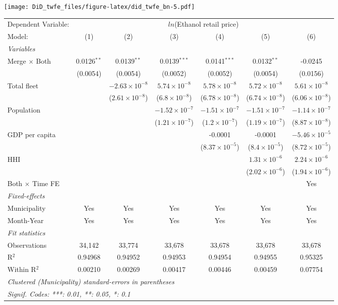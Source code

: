 \documentclass[
]{article}
\begin{document}
\texttt{[image: DiD\_twfe\_files/figure-latex/did\_twfe\_bn-5.pdf]}

\begin{tabular}{lcccccc}
\tabularnewline\midrule\midrule
Dependent Variable:&\multicolumn{6}{c}{$ln$(Ethanol retail price)}\\
Model:&(1) & (2) & (3) & (4) & (5) & (6)\\
\midrule \emph{Variables}&   &   &   &   &   &  \\
Merge $\times $ Both & 0.0126$^{**}$ & 0.0139$^{**}$ & 0.0139$^{***}$ & 0.0141$^{***}$ & 0.0132$^{**}$ & -0.0245\\
  &(0.0054) & (0.0054) & (0.0052) & (0.0052) & (0.0054) & (0.0156)\\
Total fleet &    & $-2.63\times 10^{-8}$ & $5.74\times 10^{-8}$ & $5.78\times 10^{-8}$ & $5.72\times 10^{-8}$ & $5.61\times 10^{-8}$\\
  &   & ($2.61\times 10^{-8}$) & ($6.8\times 10^{-8}$) & ($6.78\times 10^{-8}$) & ($6.74\times 10^{-8}$) & ($6.06\times 10^{-8}$)\\
Population &    &    & $-1.52\times 10^{-7}$ & $-1.51\times 10^{-7}$ & $-1.51\times 10^{-7}$ & $-1.14\times 10^{-7}$\\
  &   &    & ($1.21\times 10^{-7}$) & ($1.2\times 10^{-7}$) & ($1.19\times 10^{-7}$) & ($8.87\times 10^{-8}$)\\
GDP per capita &    &    &    & -0.0001 & -0.0001 & $-5.46\times 10^{-5}$\\
  &   &    &    & ($8.37\times 10^{-5}$) & ($8.4\times 10^{-5}$) & ($8.72\times 10^{-5}$)\\
HHI &    &    &    &    & $1.31\times 10^{-6}$ & $2.24\times 10^{-6}$\\
  &   &    &    &    & ($2.02\times 10^{-6}$) & ($1.94\times 10^{-6}$)\\
Both $\times$ Time FE &  &  &  &  &  & Yes\\
\midrule \emph{Fixed-effects}&   &   &   &   &   &  \\
Municipality & Yes & Yes & Yes & Yes & Yes & Yes\\
Month-Year & Yes & Yes & Yes & Yes & Yes & Yes\\
\midrule \emph{Fit statistics}&  & & & & & \\
Observations & 34,142&33,774&33,678&33,678&33,678&33,678\\
R$^2$ & 0.94968&0.94952&0.94953&0.94954&0.94955&0.95325\\
Within R$^2$ & 0.00210&0.00269&0.00417&0.00446&0.00459&0.07754\\
\midrule\midrule\multicolumn{7}{l}{\emph{Clustered (Municipality) standard-errors in parentheses}}\\
\multicolumn{7}{l}{\emph{Signif. Codes: ***: 0.01, **: 0.05, *: 0.1}}\\
\end{tabular}
\end{document}
